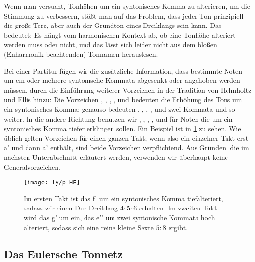 \documentclass[ngerman,11pt]{scrartcl}
\begin{document}
Wenn man versucht, Tonhöhen um ein syntonisches Komma zu alterieren, um die
Stimmung zu verbessern, stößt man auf das Problem, dass jeder Ton prinzipiell
die große Terz, aber auch der Grundton eines Dreiklangs sein kann. Das bedeutet:
Es hängt vom harmonischen Kontext ab, ob eine Tonhöhe alteriert werden muss
oder nicht, und das lässt sich leider nicht aus dem bloßen (Enharmonik
beachtenden) Tonnamen herauslesen.

Bei einer Partitur fügen wir die zusätzliche Information, dass bestimmte Noten
um ein oder mehrere syntonische Kommata abgesenkt oder angehoben werden müssen,
durch die Einführung weiterer Vorzeichen in der Tradition von Helmholtz und
Ellis \cite{HE} hinzu: Die Vorzeichen \dsharpp, \sharpp, \naturalp, \flatp, und
\dflatp bedeuten die Erhöhung des Tons um ein syntonisches Komma; genauso
bedeuten \dsharppp, \sharppp, \naturalpp, \flatpp, und \dflatpp zwei Kommata
und so weiter. In die andere Richtung benutzen wir \dsharpm, \sharpm, \naturalm,
\flatm, und \dflatm für Noten die um ein syntonisches Komma tiefer erklingen
sollen. Ein Beispiel ist in \cref{fig:HE} zu sehen. Wie üblich gelten Vorzeichen
für einen ganzen Takt; wenn also ein einzelner Takt erst \naturalm a' und dann
\natural a' enthält, sind beide Vorzeichen verpflichtend. Aus Gründen, die im
nächsten Unterabschnitt erläutert werden, verwenden wir überhaupt keine
Generalvorzeichen.

\begin{figure}\centering
  \texttt{[image: ly/p-HE]}
  \caption{Im ersten Takt ist das \sharp f’ um ein syntonisches Komma 
    tiefalteriert, sodass wir einen Dur-Dreiklang $4:5:6$ erhalten. Im zweiten
    Takt wird das g’ um ein, das \flat e’’ um zwei syntonische Kommata hoch
    alteriert, sodass sich eine reine kleine Sexte $5:8$ ergibt.}\label{fig:HE}
\end{figure}

\subsection{Das Eulersche Tonnetz}
\end{document}
